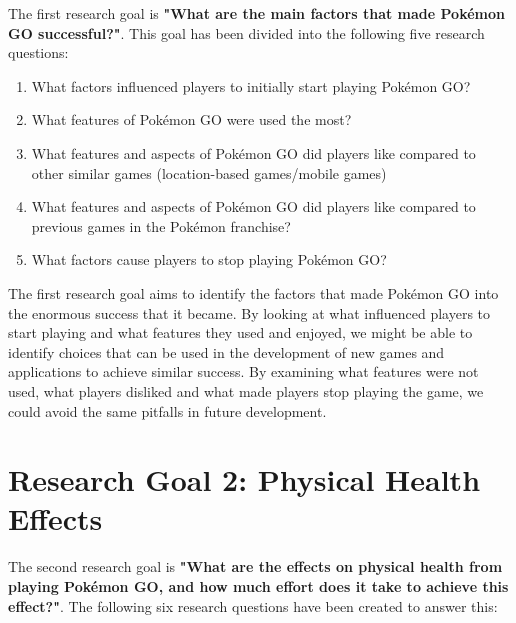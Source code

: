 The first research goal is \textbf{"What are the main factors that made Pokémon GO successful?"}. This goal has been divided into the following five research questions:

\begin{enumerate}[label=RQ1.{\arabic*}]
	\item What factors influenced players to initially start playing Pokémon GO?\label{RQ1.1}
	\item What features of Pokémon GO were used the most?\label{RQ1.2}
	\item What features and aspects of Pokémon GO did players like compared to other similar games (location-based games/mobile games)\label{RQ1.3}
	\item What features and aspects of Pokémon GO did players like compared to previous games in the Pokémon franchise?\label{RQ1.4}
	\item What factors cause players to stop playing Pokémon GO?\label{RQ1.5}
\end{enumerate}

The first research goal aims to identify the factors that made Pokémon GO into the enormous success that it became. By looking at what influenced players to start playing and what features they used and enjoyed, we might be able to identify choices that can be used in the development of new games and applications to achieve similar success. By examining what features were not used, what players disliked and what made players stop playing the game, we could avoid the same pitfalls in future development.

\section{Research Goal 2: Physical Health Effects}
\label{rg2}

The second research goal is \textbf{"What are the effects on physical health from playing Pokémon GO, and how much effort does it take to achieve this effect?"}. The following six research questions have been created to answer this:

